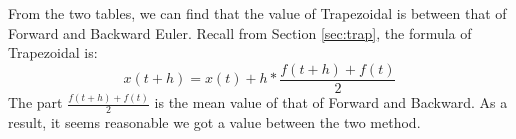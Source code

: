 \documentclass{article}
\begin{document}
From the two tables, we can find that the value of Trapezoidal is between that of Forward and Backward Euler. Recall from Section \ref{sec:trap},
the formula of Trapezoidal is:
$$
    x(t+h) = x(t) + h * \frac{f(t+h) + f(t)}{2}
$$
The part $\frac{f(t+h) + f(t)}{2}$ is the mean value of that of Forward and Backward. As a result, it seems reasonable we got a value between the 
two method.
\end{document}
